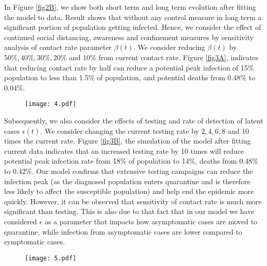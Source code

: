 \documentclass[10pt]{wlscirep}
\begin{document}
In Figure \ref{fig2B}, we show both short term and long term evolution after fitting the model to data. Result shows that without any control measure in long term a significant portion of population getting infected. Hence, we consider the effect of continued social distancing, awareness and confinement measures by sensitivity analysis of contact rate parameter $\beta(t)$. We consider reducing $\beta(t)$ by $50\%, 40\%, 30\%, 20\%$ and $10\%$ from current contact rate. Figure \ref{fig3A}, indicates that reducing contact rate by half can reduce a potential peak infection of 15\% population to less than 1.5\% of population, and potential deaths from 0.48\% to 0.04\%. 
%
\begin{figure*}[t!]
	\centering
	\begin{subfigure}[b]{\textwidth}
		\centering
		\texttt{[image: 4.pdf]}
	\end{subfigure}
	\caption{Sensitivity of $\beta(t)$ with $50\%, 40\%, 30\%, 20\%$ and $10\%$ reduction from current contact rate (Italy). Note that not all panels are in the same scale.}
	\label{fig3A} 
\end{figure*}
%

Subsequently, we also consider the effects of testing and rate of detection of latent cases $\epsilon(t)$. We consider changing the current testing rate by $2, 4, 6, 8$ and $10$ times the current rate. Figure \ref{fig3B}, the simulation of the model after fitting current data indicates that an increased testing rate by 10 times will reduce potential peak infection rate from 18\% of population to 14\%, deaths from 0.48\% to 0.42\%. Our model confirms that extensive testing campaigns can reduce the infection peak (as the diagnosed population enters quarantine and is therefore less likely to affect the susceptible population) and help end the epidemic more quickly. However, it can be observed that sensitivity of contact rate is much more significant than testing. This is also due to that fact that in our model we have considered $\epsilon$ as a parameter that impacts how asymptomatic cases are moved to quarantine, while infection from asymptomatic cases are lower compared to symptomatic cases. 


\begin{figure*}[t!]
	\centering
	\begin{subfigure}[b]{\textwidth}
		\centering
		\texttt{[image: 5.pdf]}
	\end{subfigure}
	\caption{Sensitivity of $\epsilon(t)$ with changed rate of testing by $2, 4, 6, 8$ and $10$ times the current rate (Italy). Note that not all panels are in the same scale.}
	\label{fig3B} 
\end{figure*}
%
\end{document}
